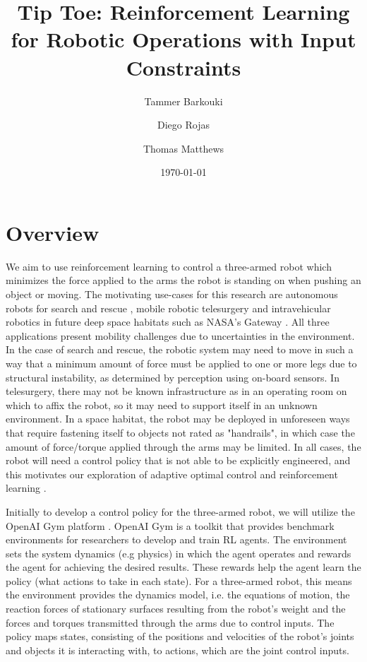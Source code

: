 \documentclass{article}
\title{Tip Toe: Reinforcement Learning for Robotic Operations with Input Constraints}
\author{Tammer Barkouki}
\author{Diego Rojas}
\author{Thomas Matthews}
\affil{}
\date{\today}
\begin{document}
\maketitle

\newpage

\section{Overview}
We aim to use reinforcement learning to control a three-armed robot which minimizes the force applied to the arms the robot is standing on when pushing an object or moving. The motivating use-cases for this research are autonomous robots for search and rescue \cite{jacoff2001standard}, mobile robotic telesurgery \cite{lum2007telesurgery} and intravehicular robotics in future deep space habitats such as NASA's Gateway \cite{coderre2019concept}. All three applications present mobility challenges due to uncertainties in the environment. In the case of search and rescue, the robotic system may need to move in such a way that a minimum amount of force must be applied to one or more legs due to structural instability, as determined by perception using on-board sensors. In telesurgery, there may not be known infrastructure as in an operating room on which to affix the robot, so it may need to support itself in an unknown environment. In a space habitat, the robot may be deployed in unforeseen ways that require fastening itself to objects not rated as "handrails", in which case the amount of force/torque applied through the arms may be limited. In all cases, the robot will need a control policy that is not able to be explicitly engineered, and this motivates our exploration of adaptive optimal control and reinforcement learning \cite{sutton1992reinforcement}.

Initially to develop a control policy for the three-armed robot, we will utilize the OpenAI Gym platform \cite{brockman2016openai}. OpenAI Gym is a toolkit that provides benchmark environments for researchers to develop and train RL agents. The environment sets the system dynamics (e.g physics) in which the agent operates and rewards the agent for achieving the desired results. These rewards help the agent learn the policy (what actions to take in each state). For a three-armed robot, this means the environment provides the dynamics model, i.e. the equations of motion, the reaction forces of stationary surfaces resulting from the robot's weight and the forces and torques transmitted through the arms due to control inputs. The policy maps states, consisting of the positions and velocities of the robot's joints and objects it is interacting with, to actions, which are the joint control inputs.
\end{document}
